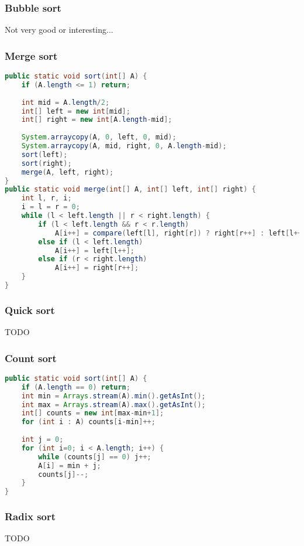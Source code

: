 \documentclass{article}
\begin{document}
\subsubsection{Bubble sort}
Not very good or interesting...

\subsubsection{Merge sort}
\begin{lstlisting}[language=java]
public static void sort(int[] A) {
    if (A.length <= 1) return;
    
    int mid = A.length/2;
    int[] left = new int[mid];
    int[] right = new int[A.length-mid];
    
    System.arraycopy(A, 0, left, 0, mid);
    System.arraycopy(A, mid, right, 0, A.length-mid);
    sort(left);
    sort(right);
    merge(A, left, right);
}
public static void merge(int[] A, int[] left, int[] right) {
    int l, r, i;
    i = l = r = 0;
    while (l < left.length || r < right.length) {
        if (l < left.length && r < r.length)
            A[i++] = compare(left[l], right[r]) ? right[r++] : left[l++];
        else if (l < left.length)
            A[i++] = left[l++];
        else if (r < right.length)
            A[i++] = right[r++];
    }    
}
\end{lstlisting}

\subsubsection{Quick sort}
TODO
\subsubsection{Count sort}
\begin{lstlisting}[language=java]
public static void sort(int[] A) {
    if (A.length == 0) return;
    int min = Arrays.stream(A).min().getAsInt();
    int max = Arrays.stream(A).max().getAsInt();
    int[] counts = new int[max-min+1];
    for (int i : A) counts[i-min]++;
    
    int j = 0;
    for (int i=0; i < A.length; i++) {
        while (counts[j] == 0) j++;
        A[i] = min + j;
        counts[j]--;
    }
}
\end{lstlisting}

\subsubsection{Radix sort}
TODO
\end{document}
